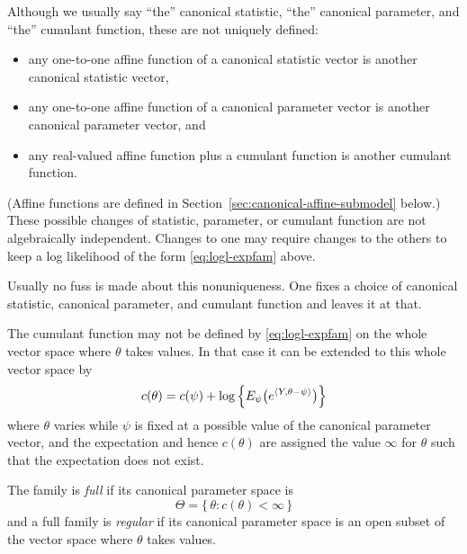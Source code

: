 Although we usually say ``the'' canonical statistic,
``the'' canonical parameter, and ``the'' cumulant function,
these are not uniquely defined:
\begin{itemize}
\item any one-to-one affine function of a canonical statistic vector is another
   canonical statistic vector,
\item any one-to-one affine function of a canonical parameter vector is another
   canonical parameter vector, and
\item any real-valued affine function plus a cumulant function is another
   cumulant function.
\end{itemize}
(Affine functions are defined in Section~\ref{sec:canonical-affine-submodel}
below.)
These possible changes of statistic, parameter, or cumulant function are not
algebraically independent.  Changes to one may require changes to the others
to keep a log likelihood of the form \eqref{eq:logl-expfam} above.

Usually no fuss is made about this nonuniqueness.  One fixes a choice
of canonical statistic, canonical parameter, and cumulant function
and leaves it at that.

The cumulant function may not be defined by \eqref{eq:logl-expfam}
on the whole vector space where $\theta$ takes values.  In that case
it can be extended to this whole vector space by
\begin{equation} \label{eq:cumfun-expfam}
   c(\theta) = c(\psi) + \log\left\{
   E_\psi\bigl( e^{\langle Y, \theta - \psi \rangle} \bigr) \right\}
\end{equation}
where $\theta$ varies while $\psi$ is fixed at
a possible value of the canonical parameter vector, and
the expectation and hence $c(\theta)$ are assigned
the value $\infty$ for $\theta$ such that the expectation does not exist.

The family is \emph{full} if its canonical parameter space is
\begin{equation} \label{eq:full-expfam}
   \Theta = \{\, \theta : c(\theta) < \infty \,\}
\end{equation}
and a full family is \emph{regular} if its canonical parameter space is an open
subset of the vector space where $\theta$ takes values.

